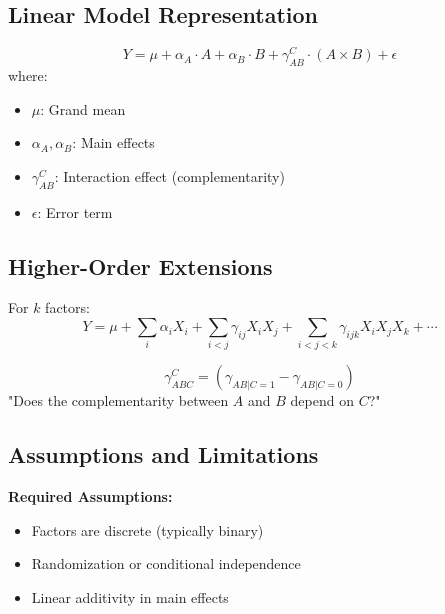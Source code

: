 \subsection{Linear Model Representation}

\begin{definition}
\begin{equation}
Y = \mu + \alpha_A \cdot A + \alpha_B \cdot B + \gamma^C_{AB} \cdot (A \times B) + \epsilon
\end{equation}
where:
\begin{itemize}
    \item $\mu$: Grand mean
    \item $\alpha_A, \alpha_B$: Main effects
    \item $\gamma^C_{AB}$: Interaction effect (complementarity)
    \item $\epsilon$: Error term
\end{itemize}
\end{definition}

\subsection{Higher-Order Extensions}

For $k$ factors:
\begin{equation}
Y = \mu + \sum_i \alpha_i X_i + \sum_{i<j} \gamma_{ij} X_i X_j + \sum_{i<j<k} \gamma_{ijk} X_i X_j X_k + \cdots
\end{equation}

\begin{definition}
\begin{equation}
\gamma^C_{ABC} = (\gamma_{AB|C=1} - \gamma_{AB|C=0})
\end{equation}
"Does the complementarity between $A$ and $B$ depend on $C$?"
\end{definition}

\subsection{Assumptions and Limitations}

\textbf{Required Assumptions:}
\begin{itemize}
    \item Factors are discrete (typically binary)
    \item Randomization or conditional independence
    \item Linear additivity in main effects
\end{itemize}

